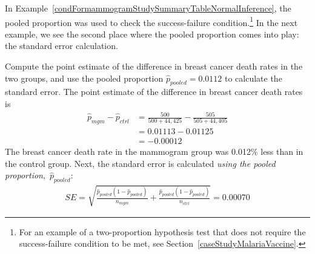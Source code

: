 In Example~\ref{condFormammogramStudySummaryTableNormalInference},
the pooled proportion was used to check the success-failure
condition.\footnote{For an example of a two-proportion
  hypothesis test that does not require the
  success-failure condition to be met, see
  Section~\ref{caseStudyMalariaVaccine}.}
In the next example, we see the second place where the pooled
proportion comes into play: the standard error calculation.

\D{\newpage}

\begin{examplewrap}
\begin{nexample}{Compute the point estimate of the difference
    in breast cancer death rates in the two groups,
    and use the pooled proportion
    $\hat{p}_{\textit{pooled}} = 0.0112$ to calculate
    the standard error.}
  The point estimate of the difference in breast cancer death
  rates is
  \begin{align*}
  \hat{p}_{mgm} - \hat{p}_{ctrl}
    &= \frac{500}{500 + 44,425} - \frac{505}{505 + 44,405} \\
    &= 0.01113 - 0.01125 \\
    &= -0.00012
  \end{align*}
  The breast cancer death rate in the mammogram group
  was 0.012\% less than in the control group.
  Next, the standard error is calculated
  \emph{using the pooled proportion},~$\hat{p}_{\textit{pooled}}$:
\begin{align*}
SE = \sqrt{
      \frac{\hat{p}_{\textit{pooled}}(1-\hat{p}_{\textit{pooled}})}
          {n_{mgm}}
      + \frac{\hat{p}_{\textit{pooled}}(1-\hat{p}_{\textit{pooled}})}
          {n_{ctrl}}
    }
	= 0.00070
\end{align*}
\end{nexample}
\end{examplewrap}

